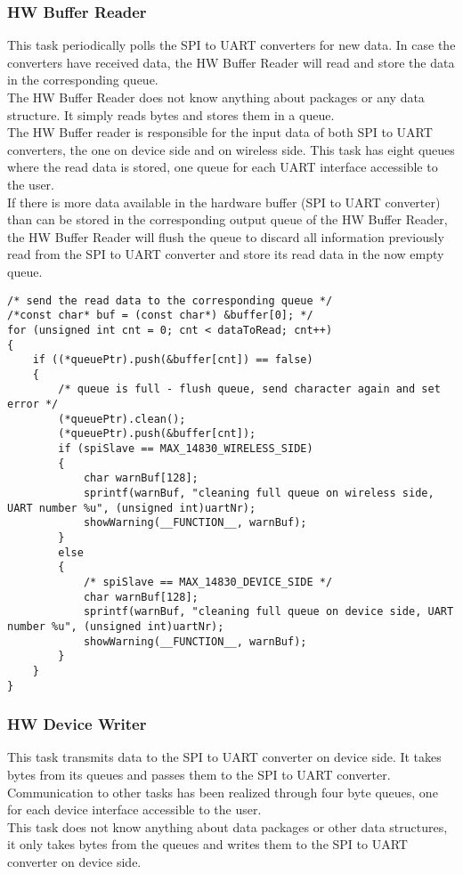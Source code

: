 \subsubsection{HW Buffer Reader}
This task periodically polls the SPI to UART converters for new data. In case the converters have received data, the HW Buffer Reader will read and store the data in the corresponding queue. \\
The HW Buffer Reader does not know anything about packages or any data structure. It simply reads bytes and stores them in a queue.\\
The HW Buffer reader is responsible for the input data of both SPI to UART converters, the one on device side and on wireless side. This task has eight queues where the read data is stored, one queue for each UART interface accessible to the user. \\
If there is more data available in the hardware buffer (SPI to UART converter) than can be stored in the corresponding output queue of the HW Buffer Reader, the HW Buffer Reader will flush the queue to discard all information previously read from the SPI to UART converter and store its read data in the now empty queue. \\
%
\begin{lstlisting}
/* send the read data to the corresponding queue */
/*const char* buf = (const char*) &buffer[0]; */
for (unsigned int cnt = 0; cnt < dataToRead; cnt++)
{
    if ((*queuePtr).push(&buffer[cnt]) == false)
    {
        /* queue is full - flush queue, send character again and set error */
        (*queuePtr).clean();
        (*queuePtr).push(&buffer[cnt]);
        if (spiSlave == MAX_14830_WIRELESS_SIDE)
        {
            char warnBuf[128];
            sprintf(warnBuf, "cleaning full queue on wireless side, UART number %u", (unsigned int)uartNr);
            showWarning(__FUNCTION__, warnBuf);
        }
        else
        {
            /* spiSlave == MAX_14830_DEVICE_SIDE */
            char warnBuf[128];
            sprintf(warnBuf, "cleaning full queue on device side, UART number %u", (unsigned int)uartNr);
            showWarning(__FUNCTION__, warnBuf);
        }
    }
}
\end{lstlisting}
%
\subsubsection{HW Device Writer}
This task transmits data to the SPI to UART converter on device side. It takes bytes from its queues and passes them to the SPI to UART converter.\\
Communication to other tasks has been realized through four byte queues, one for each device interface accessible to the user. \\
This task does not know anything about data packages or other data structures, it only takes bytes from the queues and writes them to the SPI to UART converter on device side.
